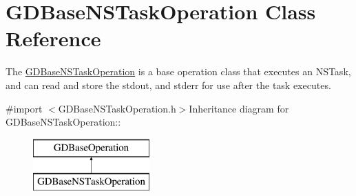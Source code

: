 \hypertarget{interface_g_d_base_n_s_task_operation}{
\section{GDBaseNSTaskOperation Class Reference}
\label{interface_g_d_base_n_s_task_operation}
}


The \hyperlink{interface_g_d_base_n_s_task_operation}{GDBaseNSTaskOperation} is a base operation class that executes an NSTask, and can read and store the stdout, and stderr for use after the task executes.  


{\ttfamily \#import $<$GDBaseNSTaskOperation.h$>$}Inheritance diagram for GDBaseNSTaskOperation::\begin{figure}[H]
\begin{center}
\leavevmode
\includegraphics[height=2cm]{interface_g_d_base_n_s_task_operation}
\end{center}
\end{figure}
